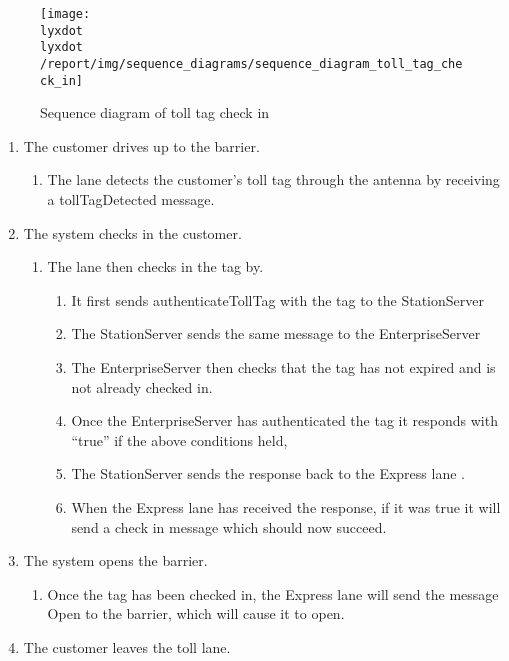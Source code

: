 
\begin{figure}
\texttt{[image: \\lyxdot \\lyxdot /report/img/sequence\_diagrams/sequence\_diagram\_toll\_tag\_check\_in]}

\caption{Sequence diagram of toll tag check in}
\label{fig:seq_check_in_toll_tag}


\end{figure}

\begin{enumerate}
\item The customer drives up to the barrier.

\begin{enumerate}
\item The lane detects the customer's toll tag through the antenna by receiving
a tollTagDetected message.
\end{enumerate}
\item The system checks in the customer.

\begin{enumerate}
\item The lane then checks in the tag by. 

\begin{enumerate}
\item It first sends authenticateTollTag with the tag to the StationServer
\item The StationServer sends the same message to the EnterpriseServer
\item The EnterpriseServer then checks that the tag has not expired and
is not already checked in.
\item Once the EnterpriseServer has authenticated the tag it responds with
``true'' if the above conditions held,
\item The StationServer sends the response back to the Express lane .
\item When the Express lane has received the response, if it was true it
will send a check in message which should now succeed.
\end{enumerate}
\end{enumerate}
\item The system opens the barrier.

\begin{enumerate}
\item Once the tag has been checked in, the Express lane will send the message
Open to the barrier, which will cause it to open.
\end{enumerate}
\item The customer leaves the toll lane.


\end{enumerate}
